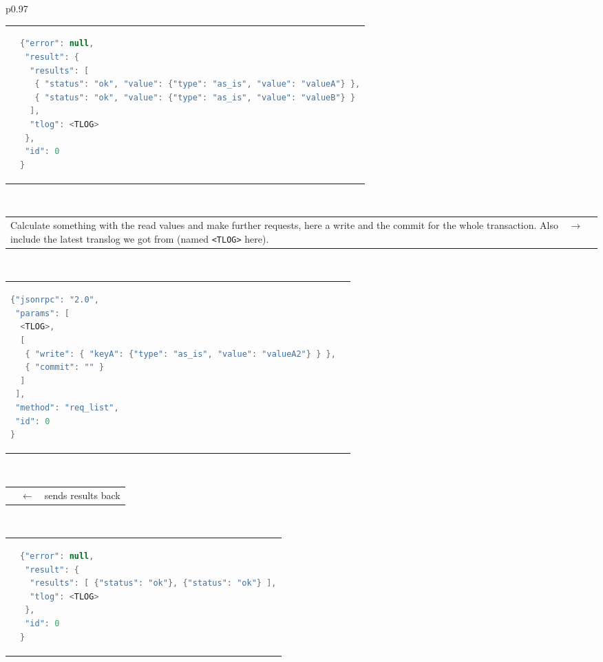 \documentclass[a4paper]{scrreprt}
\newcommand{\code}[1]{\lstinline[basicstyle=\ttfamily]!#1!}
\begin{document}
\begin{longtable}{p{}}
\begin{tabular}{p{}p{}}
& 
\vspace{-1.5em}%
\begin{lstlisting}[language=java]
{"error": null,
 "result": {
  "results": [
   { "status": "ok", "value": {"type": "as_is", "value": "valueA"} },
   { "status": "ok", "value": {"type": "as_is", "value": "valueB"} }
  ],
  "tlog": <TLOG>
 },
 "id": 0
}
\end{lstlisting} \\
\end{tabular} \\
%
\begin{tabular}{p{}cp{}}
Calculate something with the read values and make further requests, here a
write and the commit for the whole transaction. Also include the latest
translog we got from \scalaris{} (named \code{<TLOG>} here). & $\to$ & \\
\end{tabular}\vspace{-1.5em} \\
%
\begin{tabular}{p{}p{}}
\vspace{-1.5em}%
\begin{lstlisting}[language=java]
{"jsonrpc": "2.0",
 "params": [
  <TLOG>,
  [
   { "write": { "keyA": {"type": "as_is", "value": "valueA2"} } },
   { "commit": "" }
  ]
 ],
 "method": "req_list",
 "id": 0
}
\end{lstlisting}
& \\
\end{tabular}\vspace{-1em} \\
%
\begin{tabular}{p{}cp{}}
 & $\leftarrow$ & \hfill{}\scalaris{} sends results back \\
\end{tabular}\vspace{-1.5em} \\

\begin{tabular}{p{}p{}}
& 
\vspace{-1.5em}%
\begin{lstlisting}[language=java]
{"error": null,
 "result": {
  "results": [ {"status": "ok"}, {"status": "ok"} ],
  "tlog": <TLOG>
 },
 "id": 0
}
\end{lstlisting} \\
\end{tabular} \\
\end{longtable}
\end{document}
